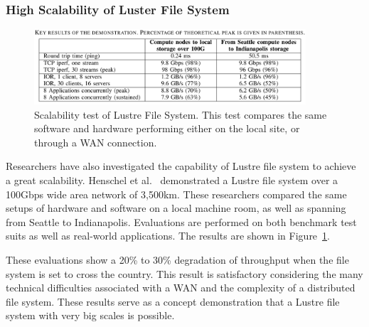 \subsubsection{High Scalability of Luster File System}
%
\begin{figure}
\centering
\includegraphics[width=0.9\textwidth]{image/lustre_scale.png}
\caption{Scalability test of Lustre File System. This test compares the same
	software and hardware performing either on the local site, or through a 
	WAN connection.}
\label{fig:lustre_scale}
\end{figure}
%
Researchers have also investigated the capability of Lustre file system
to achieve a great scalability.
%
Henschel et al.~\cite{Henschel2012} demonstrated a Lustre file system over
a 100Gbps wide area network of 3,500km.
%
These researchers compared the same setups of hardware and software on a local
machine room, as well as spanning from Seattle to Indianapolis.
%
Evaluations are performed on both benchmark test suits as well as real-world
applications.
%
The results are shown in Figure~\ref{fig:lustre_scale}.

These evaluations show a 20\% to 30\% degradation of throughput 
when the file system is set to cross the country.
%
This result is satisfactory considering the many technical difficulties 
associated with a WAN and the complexity of a distributed file system.
%
These results serve as a concept demonstration that a Lustre file system
with very big scales is possible.











